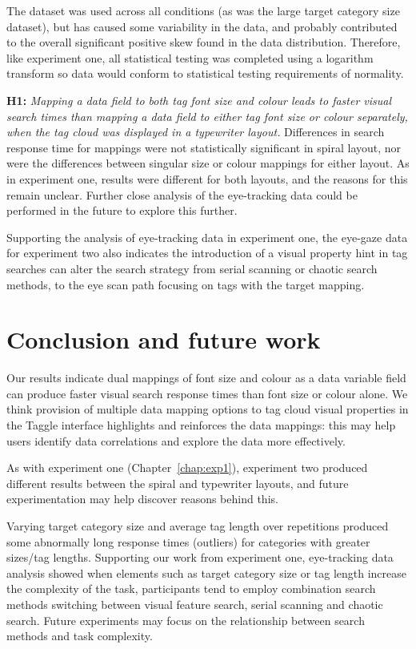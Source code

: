 The dataset was used across all conditions (as was the large target category size dataset), but has caused some variability in the data, and probably contributed to the overall significant positive skew found in the data distribution. Therefore, like experiment one, all statistical testing was completed using a logarithm transform so data would conform to statistical testing requirements of normality.

\textbf{H1:} \textit{Mapping a data field to both tag font size and colour leads to faster visual search times than mapping a data field to either tag font size or colour separately, when the tag cloud was displayed in a typewriter layout.} Differences in search response time for mappings were not statistically significant in spiral layout, nor were the differences between singular size or colour mappings for either layout. As in experiment one, results were different for both layouts, and the reasons for this remain unclear. Further close analysis of the eye-tracking data could be performed in the future to explore this further.

Supporting the analysis of eye-tracking data in experiment one, the eye-gaze data for experiment two also indicates the introduction of a visual property hint in tag searches can alter the search strategy from serial scanning or chaotic search methods, to the eye scan path focusing on tags with the target mapping. 

\section{Conclusion and future work}\label{sect:exp2conclusions}

Our results indicate dual mappings of font size and colour as a data variable field can produce faster visual search response times than font size or colour alone. We think provision of multiple data mapping options to tag cloud visual properties in the Taggle interface highlights and reinforces the data mappings: this may help users identify data correlations and explore the data more effectively.

As with experiment one (Chapter~\ref{chap:exp1}), experiment two produced different results between the spiral and typewriter layouts, and future experimentation may help discover reasons behind this.

Varying target category size and average tag length over repetitions produced some abnormally long response times (outliers) for categories with greater sizes/tag lengths. Supporting our work from experiment one, eye-tracking data analysis showed when elements such as target category size or tag length increase the complexity of the task, participants tend to employ combination search methods switching between visual feature search, serial scanning and chaotic search. Future experiments may focus on the relationship between search methods and task complexity. 




